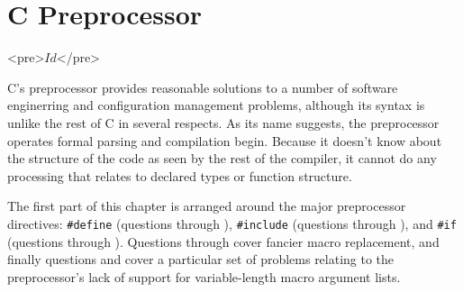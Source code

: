 \chapter{C Preprocessor}	\label{chap:preproc}

\begin{rawhtml}
<pre>$Id$</pre>
\end{rawhtml}

C's preprocessor provides reasonable solutions to a number of software
enginerring and configuration management problems, although its syntax is
unlike the rest of C in several respects. As its name suggests, the
preprocessor operates  formal parsing and compilation begin.
Because it doesn't know about the structure of the code as seen by the rest of
the compiler, it cannot do any processing that relates to declared types or
function structure.

The first part of this chapter is arranged around the major preprocessor
directives: \verb+#define+ (questions  through ), \verb+#include+
(questions  through ), and \verb+#if+
(questions  through ). Questions
 through  cover fancier macro replacement, and finally questions
 and  cover a particular set of problems relating to the
preprocessor's lack of support for variable-length macro argument lists.

